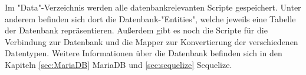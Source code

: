 
Im "Data"-Verzeichnis werden alle datenbankrelevanten Scripte gespeichert.
Unter anderem befinden sich dort die Datenbank-"Entities", welche jeweils eine Tabelle der Datenbank repräsentieren.
Außerdem gibt es noch die Scripte für die Verbindung zur Datenbank und die Mapper zur Konvertierung der verschiedenen Datentypen. 
Weitere Informationen über die Datenbank befinden sich in den Kapiteln \ref{sec:MariaDB} MariaDB und \ref{sec:sequelize} Sequelize.